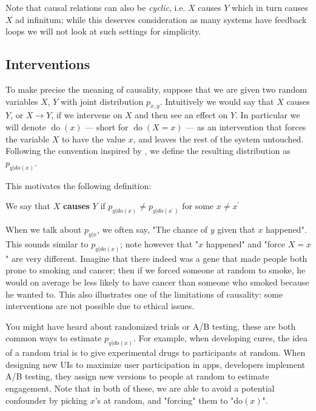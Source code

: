 Note that causal relations can also be \textit{cyclic}, i.e. $X$ causes $Y$ which in turn causes 
$X$ ad infinitum; while this deserves consideration as many systems have feedback loops we will
not look at such settings for simplicity. 

\subsection{Interventions}

To make precise the meaning of causality, suppose that we are given 
two random variables $X$, $Y$ with joint distribution $p_{x, y}$. Intuitively we 
would say that $X$ causes $Y$, or $X \rightarrow Y$, if we intervene on $X$ and then see an effect on $Y$. In particular
we will denote $\operatorname{do}(x)$ --- short for $\operatorname{do}(X = x)$ --- as an intervention
that forces the variable $X$ to have the value $x$, and leaves the rest of the system untouched. 
Following the convention inspired by \cite{pearl2000causality}, 
we define the resulting distribution as $p_{y|do(x)}$.

This motivates the following definition:

\begin{definition}
    We say that $X$ \textbf{causes} $Y$ if $p_{y|do(x)} \neq p_{y|do(x^\prime)}$ for some
    $x \neq x^\prime$
\end{definition}

When we talk about $p_{y|x}$, we often say, "The chance of $y$ given that $x$ happened". This sounds similar
to $p_{y|do(x)}$; note however that "$x$ happened" and "force $X = x$" are very different. Imagine that 
there indeed was a gene that made people both prone to smoking and cancer; then if we forced someone at 
random to smoke, he would on average be less likely to have cancer than someone who smoked because he wanted to.
This also illustrates 
one of the limitations of causality: some interventions are not possible due to ethical issues.

You might have heard about randomized trials or A/B testing, these are both common ways to estimate $p_{y|do(x)}$.
For example, when developing cures, the idea of a random trial is to give experimental drugs to participants
at random. When designing new UIs to maximize user participation in apps, developers implement A/B testing, 
they assign new versions to people at random to estimate engagement. Note that in both of these, we are able 
to avoid a potential confounder by picking $x$'s at random, and "forcing" them to "do$(x)$".

